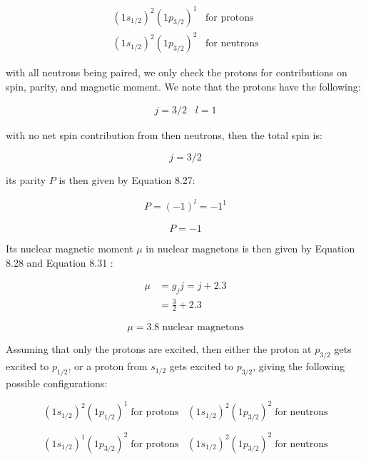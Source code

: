 \documentclass[11pt]{article}
\theoremstyle{definition}
\begin{document}
\begin{align*}
    (1s_{1/2})^2(1p_{3/2})^1 \;\;\; \text{for protons}\\
    (1s_{1/2})^2(1p_{3/2})^2 \;\;\; \text{for neutrons}
\end{align*}

with all neutrons being paired, we only check the protons for contributions on spin, parity, and magnetic moment. We note that the protons have the following:

\begin{align*}
    j=3/2 \;\;\; l=1
\end{align*}

with no net spin contribution from then neutrons, then the total spin is:

\begin{equation}
\boxed{
    j=3/2
}
\end{equation}

its parity $P$ is then given by Equation 8.27:

\begin{align*}
    P = (-1)^l = -1^1
\end{align*}

\begin{equation}
\boxed{
    P = -1
}
\end{equation}

Its nuclear magnetic moment $\mu$ in nuclear magnetons is then given by Equation 8.28 and Equation 8.31 :

\begin{align*}
    \mu &= g_j j = j+2.3\\
    &= \frac{3}{2} + 2.3
\end{align*}

\begin{equation}
\boxed{
    \mu = 3.8 \; \text{nuclear magnetons}
}
\end{equation}

Assuming that only the protons are excited, then either the proton at $p_{3/2}$ gets excited to $p_{1/2}$, or a proton from $s_{1/2}$ gets excited to $p_{3/2}$, giving the following possible configurations:

\begin{equation}
\boxed{
    (1s_{1/2})^2(1p_{1/2})^1 \; \text{for protons} \;\;\; (1s_{1/2})^2(1p_{3/2})^2 \; \text{for neutrons}
}
\end{equation}

\begin{equation}
    \boxed{
        (1s_{1/2})^{1}(1p_{3/2})^2 \; \text{for protons} \;\;\; (1s_{1/2})^2(1p_{3/2})^2 \; \text{for neutrons}
    }
\end{equation}
\end{document}
